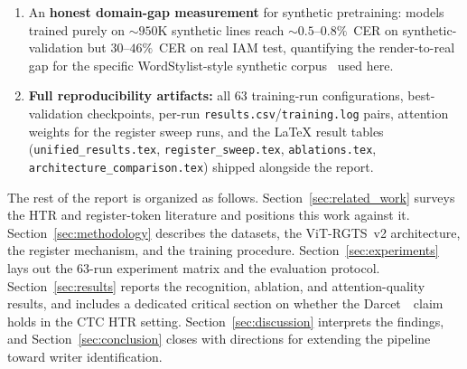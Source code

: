 \begin{enumerate}
    \item An \textbf{honest domain-gap measurement} for synthetic pretraining: models trained purely on ${\sim}950$K synthetic lines reach ${\sim}0.5$--$0.8\%$~CER on synthetic-validation but $30$--$46\%$~CER on real IAM test, quantifying the render-to-real gap for the specific WordStylist-style synthetic corpus~\cite{nikolaidou2023wordstylist} used here.
    \item \textbf{Full reproducibility artifacts:} all $63$ training-run configurations, best-validation checkpoints, per-run \texttt{results.csv}/\texttt{training.log} pairs, attention weights for the register sweep runs, and the LaTeX result tables (\texttt{unified\_results.tex}, \texttt{register\_sweep.tex}, \texttt{ablations.tex}, \texttt{architecture\_comparison.tex}) shipped alongside the report.
\end{enumerate}

The rest of the report is organized as follows. Section~\ref{sec:related_work} surveys the HTR and register-token literature and positions this work against it. Section~\ref{sec:methodology} describes the datasets, the ViT-RGTS~v2 architecture, the register mechanism, and the training procedure. Section~\ref{sec:experiments} lays out the $63$-run experiment matrix and the evaluation protocol. Section~\ref{sec:results} reports the recognition, ablation, and attention-quality results, and includes a dedicated critical section on whether the Darcet~\etal\ claim holds in the CTC HTR setting. Section~\ref{sec:discussion} interprets the findings, and Section~\ref{sec:conclusion} closes with directions for extending the pipeline toward writer identification.
